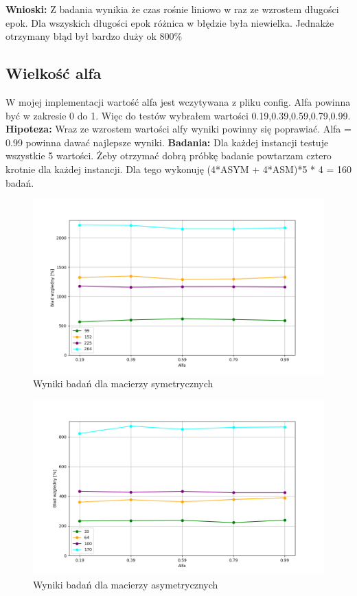 \documentclass{article}
\begin{document}
        \FloatBarrier
        \textbf{Wnioski: } Z badania wynikia że czas rośnie liniowo w raz ze wzrostem 
        długości epok. Dla wszyskich długości epok różnica w błędzie była niewielka.
        Jednakże otrzymany błąd był bardzo duży ok 800\%
      \subsection{Wielkość alfa}
        W mojej implementacji wartość alfa jest wczytywana z pliku config. Alfa powinna
        być w zakresie 0 do 1. Więc do testów wybrałem wartości 0.19,0.39,0.59,0.79,0.99. \linebreak
        \textbf{Hipoteza: } Wraz ze wzrostem wartości alfy wyniki powinny się poprawiać.
        Alfa = 0.99 powinna dawać najlepsze wyniki.\linebreak
        \textbf{Badania: } Dla każdej instancji testuje wszystkie 5 wartości. 
        Żeby otrzymać dobrą próbkę badanie powtarzam cztero krotnie dla każdej 
        instancji. Dla tego wykonuję (4*ASYM + 4*ASM)*5 * 4 = 160 badań.\linebreak
        \FloatBarrier
        
        \FloatBarrier
        \begin{figure}[ht]
          \centering
          \includegraphics[width=\textwidth]{src/plots/symAnAlpha.png}
          \caption{Wyniki badań dla macierzy symetrycznych}
          \label{fig:symAlpha}
        \end{figure}
        \begin{figure}[ht]
          \centering
          \includegraphics[width=\textwidth]{src/plots/asymAnAlpha.png}
          \caption{Wyniki badań dla macierzy asymetrycznych}
          \label{fig:asymAlphan}
        \end{figure}
\end{document}
